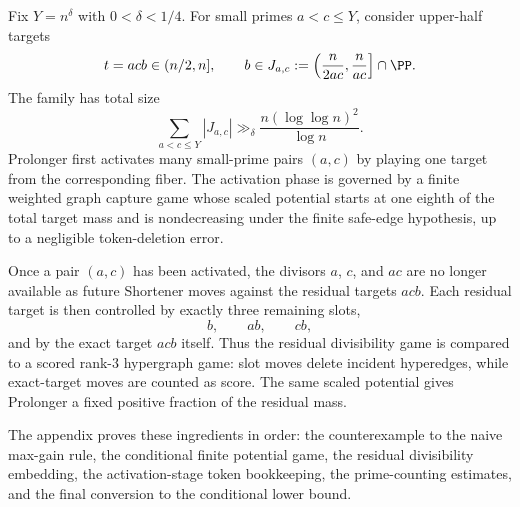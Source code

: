 Fix $Y=n^\delta$ with $0<\delta<1/4$.  For small primes $a<c\le Y$, consider
upper-half targets
\[
  t=acb\in (n/2,n],
  \qquad
  b\in J_{a,c}:=\left(\frac{n}{2ac},\frac{n}{ac}\right]\cap\PP.
\]
The family has total size
\[
  \sum_{a<c\le Y}|J_{a,c}|
  \gg_\delta \frac{n(\log\log n)^2}{\log n}.
\]
Prolonger first activates many small-prime pairs $(a,c)$ by playing one target
from the corresponding fiber.  The activation phase is governed by a finite
weighted graph capture game whose scaled potential starts at one eighth of the
total target mass and is nondecreasing under the finite safe-edge hypothesis,
up to a negligible token-deletion error.

Once a pair $(a,c)$ has been activated, the divisors $a$, $c$, and $ac$ are no
longer available as future Shortener moves against the residual targets
$acb$.  Each residual target is then controlled by exactly three remaining
slots,
\[
  b,\qquad ab,\qquad cb,
\]
and by the exact target $acb$ itself.  Thus the residual divisibility game is
compared to a scored rank-$3$ hypergraph game: slot moves delete incident
hyperedges, while exact-target moves are counted as score.  The same scaled
potential gives Prolonger a fixed positive fraction of the residual mass.

The appendix proves these ingredients in order: the counterexample to the
naive max-gain rule, the conditional finite potential game, the residual
divisibility embedding, the activation-stage token bookkeeping, the
prime-counting estimates, and the final conversion to the conditional lower
bound.
